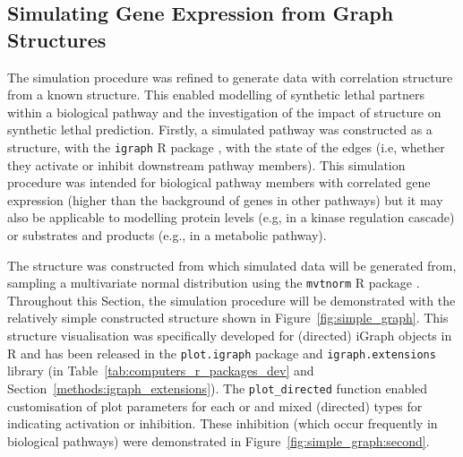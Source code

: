 \subsection{Simulating Gene Expression from Graph Structures} \label{methods:graphsim}
The simulation procedure was refined to generate  data with correlation structure from a known  structure. %
This enabled modelling of \gls{synthetic lethal} partners within a biological pathway and the investigation of the impact of  structure on \gls{synthetic lethal} prediction. Firstly, a simulated pathway was constructed as a  structure, with the \texttt{igraph} R package \citet{igraph}, with the state of the \glspl{edge} (i.e, whether they activate or inhibit downstream pathway members). This simulation procedure was intended for biological pathway members with correlated \gls{gene expression} (higher than the background of genes in other pathways) but it may also be applicable to modelling protein levels (e.g, in a kinase regulation cascade) or substrates and products (e.g., in a metabolic pathway).%

The  structure was constructed from which simulated data will be generated from, sampling a multivariate normal distribution using the \texttt{mvtnorm} R package \citep{Genz2009, mvtnorm}. Throughout this Section, the simulation procedure will be demonstrated with the relatively simple constructed  structure shown in Figure~\ref{fig:simple_graph}. This  structure visualisation was specifically developed for (directed) iGraph objects in R and has been released in the \texttt{plot.igraph} package and \texttt{igraph.extensions} library (in Table~\ref{tab:computers_r_packages_dev} and Section~\ref{methods:igraph_extensions}). The \texttt{plot\_directed} function enabled customisation of plot parameters for each  or  and mixed (directed)  types for indicating activation or inhibition. These inhibition  (which occur frequently in biological pathways) were demonstrated in Figure~\ref{fig:simple_graph:second}.

